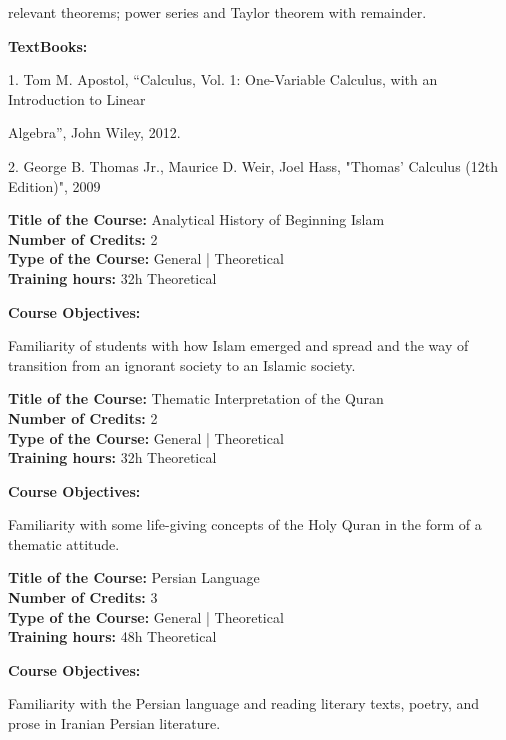 \documentclass[12pt,a4paper]{article}
\begin{document}
relevant theorems; power series and Taylor theorem with remainder.\par\vspace{4pt}
\textbf{TextBooks:}\par\vspace{2pt}
1. Tom M. Apostol, “Calculus, Vol. 1: One-Variable Calculus, with an Introduction to Linear\par
Algebra”, John Wiley, 2012.\par
2. George B. Thomas Jr., Maurice D. Weir, Joel Hass, "Thomas' Calculus (12th Edition)", 2009\par
\vspace{4pt}

\newpage
\nopagebreak
\textbf{Title of the Course:} Analytical History of Beginning Islam\\
\textbf{Number of Credits:} 2\\
\textbf{Type of the Course:} General | Theoretical\\
\textbf{Training hours:} 32h Theoretical\par\vspace{4pt}
\textbf{Course Objectives:}\par\vspace{2pt}
Familiarity of students with how Islam emerged and spread and the way of transition from an
ignorant society to an Islamic society.\par\vspace{4pt}

\par\vspace{14pt}
\nopagebreak
\textbf{Title of the Course:} Thematic Interpretation of the Quran\\
\textbf{Number of Credits:} 2\\
\textbf{Type of the Course:} General | Theoretical\\
\textbf{Training hours:} 32h Theoretical\par\vspace{4pt}
\textbf{Course Objectives:}\par\vspace{2pt}
Familiarity with some life-giving concepts of the Holy Quran in the form of a thematic attitude.\par\vspace{4pt}

\par\vspace{14pt}
\nopagebreak
\textbf{Title of the Course:} Persian Language\\
\textbf{Number of Credits:} 3\\
\textbf{Type of the Course:} General | Theoretical\\
\textbf{Training hours:} 48h Theoretical\par\vspace{4pt}
\textbf{Course Objectives:}\par\vspace{2pt}
Familiarity with the Persian language and reading literary texts, poetry, and prose in Iranian
Persian literature.\par\vspace{4pt}
\end{document}
